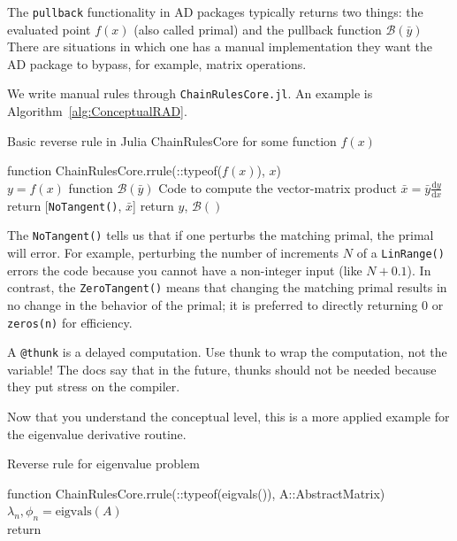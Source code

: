\documentclass[10pt]{article}
\newcommand{\dd}[2]{\frac{\textrm{d} #1}{\textrm{d} #2}}
\newcommand{\mcal}[1]{\mathcal{#1}} %
\newcommand{\tn}[1]{\textrm{#1}}
\begin{document}
The \texttt{pullback} functionality in AD packages typically returns two things: the evaluated point $f(x)$ (also called primal) and the pullback function $\mcal{B}(\bar{y})$
There are situations in which one has a manual implementation they want the {AD} package to bypass, for example, matrix operations.

We write manual rules through \texttt{ChainRulesCore.jl}.
An example is Algorithm~\ref{alg:ConceptualRAD}.
\begin{algorithm}[htb!]
    \caption{\label{alg:ConceptualRAD} Basic reverse rule in Julia ChainRulesCore for some function $f(x)$}
    \DontPrintSemicolon
    function ChainRulesCore.rrule(::typeof($f(x)$), $x$)\\
    \quad $y = f(x)$ 
    \quad function $\mcal{B}(\bar{y})$\;
    \quad \quad Code to compute the vector-matrix product $\bar{x}= \bar{y} \dd{y}{x}$ 
    \quad return [\texttt{NoTangent()}, $\bar{x}$] 
    return $y$, $\mcal{B}()$
\end{algorithm}

The \texttt{NoTangent()} tells us that if one perturbs the matching primal, the primal will error.
For example, perturbing the number of increments $N$ of a \texttt{LinRange()} errors the code because you cannot have a non-integer input (like $N+0.1$).
In contrast, the \texttt{ZeroTangent()} means that changing the matching primal results in no change in the behavior of the primal;
it is preferred to directly returning 0 or \texttt{zeros(n)} for efficiency.

A \texttt{@thunk} is a delayed computation.
Use thunk to wrap the computation, not the variable!
The docs say that in the future, thunks should not be needed because they put stress on the compiler.

Now that you understand the conceptual level, this is a more applied example for the eigenvalue derivative routine.
\begin{algorithm}[htb!]
    \caption{\label{alg:EigenRAD} Reverse rule for eigenvalue problem}
    function ChainRulesCore.rrule(::typeof(eigvals()), A::AbstractMatrix)\\
    \quad $\lambda_n, \phi_n = \tn{eigvals}(A)$ \\
    return
\end{algorithm}
\end{document}
